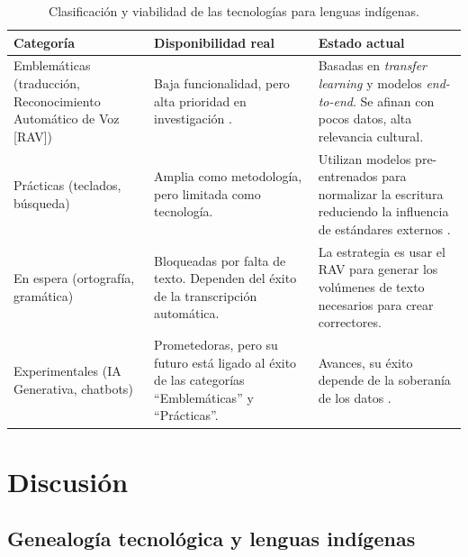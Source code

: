 \documentclass[spanish]{textolivre}
\begin{document}
\begin{table}[htbp]
\centering
\caption{Clasificación y viabilidad de las tecnologías para lenguas indígenas.}
\label{tab3}
\small
\setlength{\extrarowheight}{3pt}
\begin{tabularx}{\textwidth}{>{\raggedright\arraybackslash}p{2.8cm} >{\raggedright\arraybackslash}X >{\raggedright\arraybackslash}X}
\toprule
Categoría & Disponibilidad real & Estado actual \\
\midrule

Emblemáticas \newline(traducción, Reconocimiento Automático de Voz [RAV]) & 
Baja funcionalidad, pero alta prioridad en investigación \cite{HornaSaldana2025}. & 
Basadas en \textit{transfer learning} y modelos \textit{end-to-end}. Se afinan con pocos datos, alta relevancia cultural. \\
\addlinespace

Prácticas \newline(teclados, búsqueda) & 
Amplia como metodología, pero limitada como tecnología. & 
Utilizan modelos pre-entrenados para normalizar la escritura reduciendo la influencia de estándares externos \cite{Gasparotto2026}. \\
\addlinespace

En espera \newline(ortografía, gramática) & 
Bloqueadas por falta de texto. Dependen del éxito de la transcripción automática. & 
La estrategia es usar el RAV para generar los volúmenes de texto necesarios para crear correctores. \\
\addlinespace

Experimentales \newline(IA Generativa, chatbots) & 
Prometedoras, pero su futuro está ligado al éxito de las categorías ``Emblemáticas'' y ``Prácticas''. & 
Avances, su éxito depende de la soberanía de los datos \cite{Moraes2025}. \\
\bottomrule
\end{tabularx}
\end{table}


\section{Discusión}

\subsection{Genealogía tecnológica y lenguas indígenas}
\end{document}
